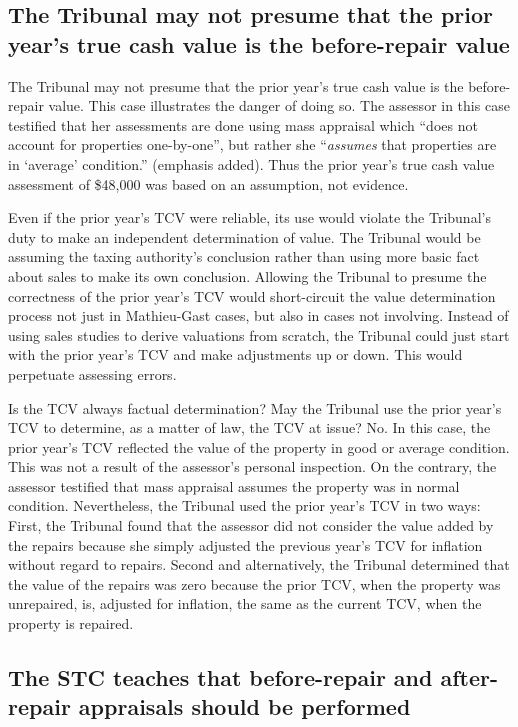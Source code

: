 \documentclass[12pt,\documentclassflag]{michiganCourtOfAppealsBrief}
\begin{document}
\subsection{The Tribunal may not presume that the prior year's true cash value is the before-repair value}

The Tribunal may not presume that the prior year's true cash value is the before-repair value. This case illustrates the danger of doing so. The assessor in this case testified that her assessments are done using mass appraisal which ``does not account for properties one-by-one'', but rather she ``{\em assumes} that properties are in `average' condition.''  (emphasis added). Thus the prior year's true cash value assessment of \$48,000 was based on an assumption, not evidence.

Even if the prior year's TCV were reliable, its use would violate the Tribunal's duty to make an independent determination of value. The Tribunal would be assuming the taxing authority's conclusion rather than using more basic fact about sales to make its own conclusion. Allowing the Tribunal to presume the correctness of the prior year's TCV would short-circuit the value determination process not just in Mathieu-Gast cases, but also in cases not involving. Instead of using sales studies to derive valuations from scratch, the Tribunal could just start with the prior year's TCV and make adjustments up or down. This would perpetuate assessing errors.

Is the TCV always factual determination? 
May the Tribunal use the prior year's TCV to determine, as a matter of law, the TCV at issue? No. 
In this case, the prior year's TCV reflected the value of the property in good or average condition. This was not a result of the assessor's personal inspection. On the contrary, the assessor testified that mass appraisal assumes the property was in normal condition. Nevertheless, the Tribunal used the prior year's TCV in two ways: First, the Tribunal found that the assessor did not consider the value added by the repairs because she simply adjusted the previous year's TCV for inflation without regard to repairs. Second and alternatively, the Tribunal determined that the value of the repairs was zero because the prior TCV, when the property was unrepaired, is, adjusted for inflation, the same as the current TCV, when the property is repaired.

\subsection{The STC teaches that before-repair and after-repair appraisals should be performed}
\end{document}
